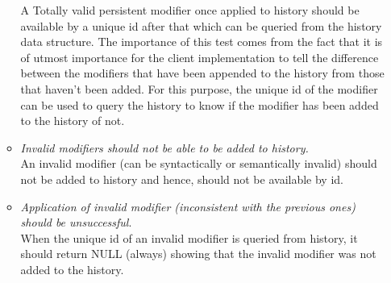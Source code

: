 \begin{enumerate}[\IEEEsetlabelwidth{Z}]
\begin{itemize}[]
A Totally valid persistent modifier once applied to history should be available by a unique id after that which can be queried from the history data structure. The importance of this test comes from the fact that it is of utmost importance for the client implementation to tell the difference between the modifiers that have been appended to the history from those that haven't been added. For this purpose, the unique id of the modifier can be used to query the history to know if the modifier has been added to the history of not.
\item \textit{Invalid modifiers should not be able to be added to history.}\\
An invalid modifier (can be syntactically or semantically invalid) should not be added to history and hence, should not be available by id.
\item \textit{Application of invalid modifier (inconsistent with the previous ones) should be unsuccessful}.\\
When the unique id of an invalid modifier is queried from history, it should return NULL (always) showing that the invalid modifier was not added to the history.
\end{itemize}

\end{enumerate}



